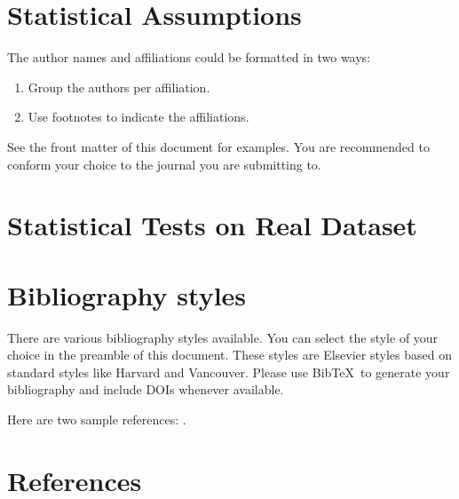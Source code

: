 \documentclass[review]{elsarticle}
\begin{document}
\section{Statistical Assumptions}

The author names and affiliations could be formatted in two ways:
\begin{enumerate}[(1)]
\item Group the authors per affiliation.
\item Use footnotes to indicate the affiliations.
\end{enumerate}
See the front matter of this document for examples. You are recommended to conform your choice to the journal you are submitting to.


\section{Statistical Tests on Real Dataset}

\section{Bibliography styles}

There are various bibliography styles available. You can select the style of your choice in the preamble of this document. These styles are Elsevier styles based on standard styles like Harvard and Vancouver. Please use Bib\TeX\ to generate your bibliography and include DOIs whenever available.

Here are two sample references: \cite{Michel2012,Scholkopf2001}.

\section*{References}


\end{document}
